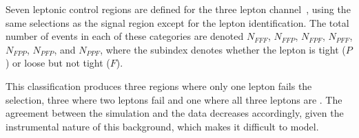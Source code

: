 \label{sec:lepCR3l}


Seven leptonic control regions are defined for the three lepton channel~\cite{CMS-SMP-20-014},
using the same selections as the signal region except for the lepton identification.
The total number of events in each of these categories are denoted
$N_{FFF}$, $N_{FFP}$, $N_{FPF}$, $N_{PFF}$, $N_{FPP}$, $N_{PFP}$, and $N_{PPF}$, where the subindex denotes whether the lepton is tight ($P$) or loose but not tight ($F$).

This classification produces three regions where only one lepton fails the selection, three where two leptons fail and one where all three leptons are \nonprompt.
The agreement between the simulation and the data decreases accordingly, given the instrumental nature of this background, which makes it difficult to model.

